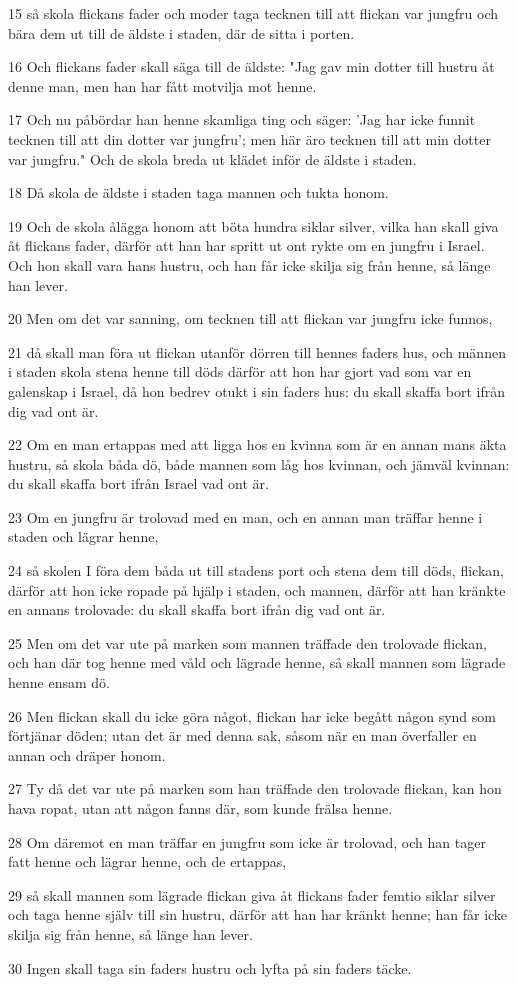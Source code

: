 \par 15 så skola flickans fader och moder taga tecknen till att flickan var jungfru och bära dem ut till de äldste i staden, där de sitta i porten.
\par 16 Och flickans fader skall säga till de äldste: "Jag gav min dotter till hustru åt denne man, men han har fått motvilja mot henne.
\par 17 Och nu påbördar han henne skamliga ting och säger: 'Jag har icke funnit tecknen till att din dotter var jungfru'; men här äro tecknen till att min dotter var jungfru." Och de skola breda ut klädet inför de äldste i staden.
\par 18 Då skola de äldste i staden taga mannen och tukta honom.
\par 19 Och de skola ålägga honom att böta hundra siklar silver, vilka han skall giva åt flickans fader, därför att han har spritt ut ont rykte om en jungfru i Israel. Och hon skall vara hans hustru, och han får icke skilja sig från henne, så länge han lever.
\par 20 Men om det var sanning, om tecknen till att flickan var jungfru icke funnos,
\par 21 då skall man föra ut flickan utanför dörren till hennes faders hus, och männen i staden skola stena henne till döds därför att hon har gjort vad som var en galenskap i Israel, då hon bedrev otukt i sin faders hus: du skall skaffa bort ifrån dig vad ont är.
\par 22 Om en man ertappas med att ligga hos en kvinna som är en annan mans äkta hustru, så skola båda dö, både mannen som låg hos kvinnan, och jämväl kvinnan: du skall skaffa bort ifrån Israel vad ont är.
\par 23 Om en jungfru är trolovad med en man, och en annan man träffar henne i staden och lägrar henne,
\par 24 så skolen I föra dem båda ut till stadens port och stena dem till döds, flickan, därför att hon icke ropade på hjälp i staden, och mannen, därför att han kränkte en annans trolovade: du skall skaffa bort ifrån dig vad ont är.
\par 25 Men om det var ute på marken som mannen träffade den trolovade flickan, och han där tog henne med våld och lägrade henne, så skall mannen som lägrade henne ensam dö.
\par 26 Men flickan skall du icke göra något, flickan har icke begått någon synd som förtjänar döden; utan det är med denna sak, såsom när en man överfaller en annan och dräper honom.
\par 27 Ty då det var ute på marken som han träffade den trolovade flickan, kan hon hava ropat, utan att någon fanns där, som kunde frälsa henne.
\par 28 Om däremot en man träffar en jungfru som icke är trolovad, och han tager fatt henne och lägrar henne, och de ertappas,
\par 29 så skall mannen som lägrade flickan giva åt flickans fader femtio siklar silver och taga henne själv till sin hustru, därför att han har kränkt henne; han får icke skilja sig från henne, så länge han lever.
\par 30 Ingen skall taga sin faders hustru och lyfta på sin faders täcke.

